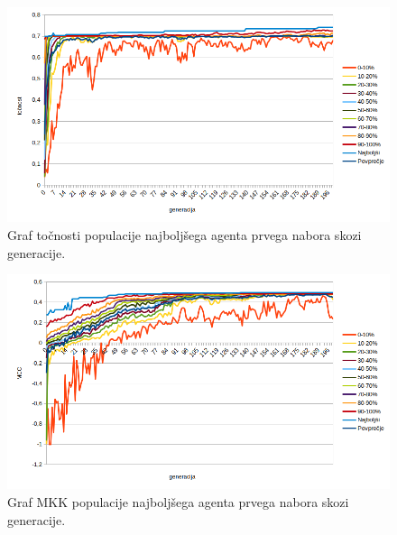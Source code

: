 \begin{figure}[H]
    \begin{center}
        \includegraphics[width=13cm]{car/1/acc}
    \end{center}
    \caption{Graf točnosti populacije najboljšega agenta prvega nabora skozi generacije.}
    \label{fig:car_acc_1}
\end{figure}

\begin{figure}[H]
    \begin{center}
        \includegraphics[width=13cm]{car/1/mcc}
    \end{center}
    \caption{Graf MKK populacije najboljšega agenta prvega nabora skozi generacije.}
    \label{fig:car_mcc_1}
\end{figure}

